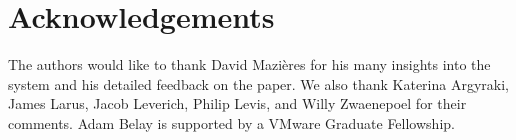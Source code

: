 
\section*{Acknowledgements}

The authors would like to thank David Mazi{\`e}res for his many
insights into the system and his detailed feedback on the
paper. We also thank Katerina Argyraki, James Larus, Jacob Leverich, Philip Levis, and Willy
Zwaenepoel for their comments. Adam Belay is supported
by a VMware Graduate Fellowship.

\begin{comment}
\begin{itemize}
\item David Mazieres
\item Carlos Perez (EPFL) last minute IT setup
\item Detailed comments: Jacob Leverich, Jim Larus
\item High-level comments: Katerina Argyraki, Willy Z, Phil Levis
\item Sheperd
\item VMware Graduate Fellowship (for Adam)
\end{itemize}
\end{comment}


